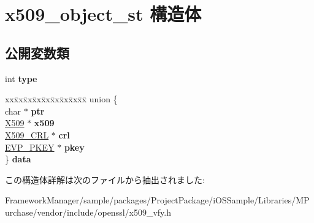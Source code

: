 \hypertarget{structx509__object__st}{}\section{x509\+\_\+object\+\_\+st 構造体}
\label{structx509__object__st}
\subsection*{公開変数類}
\begin{DoxyCompactItemize}
\item 
\hypertarget{structx509__object__st_a9a1693800fb57bf3d3e2f47d2f57ea60}{}int {\bfseries type}\label{structx509__object__st_a9a1693800fb57bf3d3e2f47d2f57ea60}

\item 
\hypertarget{structx509__object__st_a1bb6abfabdada1de0185459477fe0046}{}\begin{tabbing}
xx\=xx\=xx\=xx\=xx\=xx\=xx\=xx\=xx\=\kill
union \{\\
\>char $\ast$ {\bfseries ptr}\\
\>\hyperlink{structx509__st}{X509} $\ast$ {\bfseries x509}\\
\>\hyperlink{struct_x509__crl__st}{X509\_CRL} $\ast$ {\bfseries crl}\\
\>\hyperlink{structevp__pkey__st}{EVP\_PKEY} $\ast$ {\bfseries pkey}\\
\} {\bfseries data}\label{structx509__object__st_a1bb6abfabdada1de0185459477fe0046}
\\

\end{tabbing}\end{DoxyCompactItemize}


この構造体詳解は次のファイルから抽出されました\+:\begin{DoxyCompactItemize}
\item 
Framework\+Manager/sample/packages/\+Project\+Package/i\+O\+S\+Sample/\+Libraries/\+M\+Purchase/vendor/include/openssl/x509\+\_\+vfy.\+h\end{DoxyCompactItemize}

